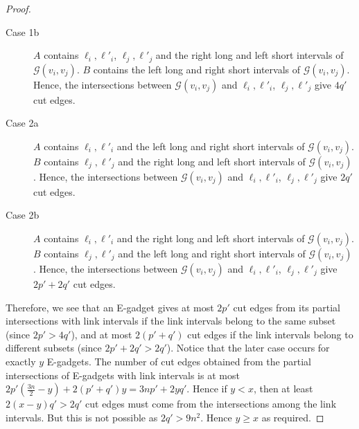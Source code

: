 \documentclass[11pt]{article}
\begin{document}
\begin{proof}
\begin{description}
 
 \item [Case 1b] $A$ contains $\ell_i, \ell'_i$, $\ell_j, \ell'_j$ and the right long and left short intervals of $\mathcal{G}(v_i, v_j)$. $B$ contains the left long and right short intervals of $\mathcal{G}(v_i, v_j)$. Hence, the intersections between $\mathcal{G}(v_i, v_j)$ and $\ell_i, \ell'_i$, $\ell_j, \ell'_j$ give $4q'$ cut edges. 



 \item [Case 2a] $A$ contains $\ell_i, \ell'_i$ and the left long and right short intervals of $\mathcal{G}(v_i, v_j)$. $B$ contains $\ell_j, \ell'_j$ and the right long and left short intervals of $\mathcal{G}(v_i, v_j)$. Hence, the intersections between $\mathcal{G}(v_i, v_j)$ and $\ell_i, \ell'_i$, $\ell_j, \ell'_j$ give $2q'$ cut edges. 
 
 
 \item [Case 2b] $A$ contains $\ell_i, \ell'_i$ and the right long and left short intervals of $\mathcal{G}(v_i, v_j)$. $B$ contains $\ell_j, \ell'_j$ and the left long and right short intervals of $\mathcal{G}(v_i, v_j)$. Hence, the intersections between $\mathcal{G}(v_i, v_j)$ and $\ell_i, \ell'_i$, $\ell_j, \ell'_j$ give $2p' + 2q'$ cut edges.  
 \end{description}



Therefore, we see that an  E-gadget gives at most $2p'$ cut edges from its partial intersections with link intervals if the link intervals belong to the same subset (since $2p' > 4q'$), and at most $2(p'+q')$ cut edges if the link intervals belong to different subsets (since $2p' + 2q' > 2q'$). Notice that the later case occurs for exactly $y$ E-gadgets. The number of cut edges obtained from the partial intersections of E-gadgets with link intervals is at most $2p'(\frac{3n}{2}-y) + 2(p'+ q')y = 3np' + 2yq'$. Hence if $y<x$, then at least $2(x-y)q' > 2q'$ cut edges must come from the intersections among the link intervals. But this is not possible as $2q' > 9n^2$. Hence $y \geq x$ as required.  
 \end{proof}


% 
% 
\end{document}
